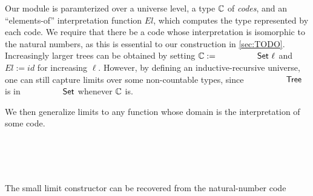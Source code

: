 Our module is paramterized over a universe level, a type ${\mathbb{C}}$ of \textit{codes}, and an ``elements-of'' interpretation
function $\mathit{El}$, which computes the type represented by each code.
We require that there be a code whose interpretation is isomorphic to the natural numbers,
as this is essential to our construction in \cref{sec:TODO}.
Increasingly larger trees can be obtained by setting $\bC := \AgdaPrimitive{Set} \ \ell$ and
$\mathit{El} := \mathit{id}$ for increasing $\ell$.
However, by defining an inductive-recursive universe,
one can still capture limits over some non-countable types, since
 $\AgdaDatatype{Tree}$ is in $\AgdaPrimitive{Set}$ whenever ${\mathbb{C}}$ is.

We then generalize limits to any function whose domain is the interpretation of some code.
\begin{code}%
%
\>[4]\AgdaSpace{}%
\AgdaSpace{}%
\AgdaSymbol{:}\AgdaSpace{}%
\AgdaSpace{}%
\AgdaSpace{}%
\<%
\\
\>[4][@{}l@{\AgdaIndent{0}}]%
\>[6]\AgdaSpace{}%
\AgdaSymbol{:}\AgdaSpace{}%
\<%
\\
%
\>[6]\AgdaSpace{}%
\AgdaSymbol{:}\AgdaSpace{}%
\AgdaSpace{}%
\AgdaSpace{}%
\<%
\\
%
\>[6]\AgdaSpace{}%
\AgdaSymbol{:}\AgdaSpace{}%
%
\>[15]\AgdaSymbol{(}\AgdaSpace{}%
\AgdaSymbol{:}\AgdaSpace{}%
\AgdaSpace{}%
\AgdaSymbol{)}\AgdaSpace{}%
\AgdaSpace{}%
\AgdaSymbol{(}\AgdaSpace{}%
\AgdaSymbol{:}\AgdaSpace{}%
\AgdaSpace{}%
\AgdaSpace{}%
\AgdaSpace{}%
\AgdaSymbol{)}\AgdaSpace{}%
\AgdaSpace{}%
\<%
\end{code}

The small limit constructor can be recovered from the natural-number code
\begin{code}%
%
\>[4]\AgdaSpace{}%
\AgdaSymbol{:}\AgdaSpace{}%
\AgdaSymbol{(}\AgdaSpace{}%
\AgdaSpace{}%
\AgdaSymbol{)}\AgdaSpace{}%
\AgdaSpace{}%
\<%
\\
%
\>[4]\AgdaSpace{}%
\AgdaSpace{}%
\AgdaSymbol{=}\AgdaSpace{}%
\AgdaSpace{}%
%
\>[21]\AgdaSpace{}%
\AgdaSpace{}%
\AgdaSpace{}%
\AgdaSpace{}%
\AgdaSymbol{(}\AgdaSpace{}%
\AgdaSpace{}%
\AgdaSymbol{))}\<%
\end{code}

